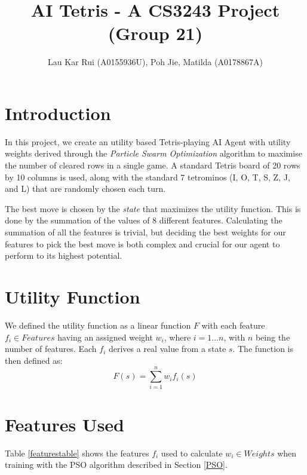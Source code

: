 \documentclass[12pt]{article}
\title{\vspace{-4.5cm}AI Tetris - A CS3243 Project (Group 21)}
\author{Lau Kar Rui (A0155936U), Poh Jie, Matilda (A0178867A)}
\numberwithin{table}{section}
\begin{document}
 
\baselineskip17.5pt
\maketitle 

\section{Introduction}
In this project, we create an utility based Tetris-playing AI Agent with utility weights derived through the \emph{Particle Swarm Optimization} algorithm to maximise the number of cleared rows in a single game. A standard Tetris board of 20 rows by 10 columns is used, along with the standard 7 tetrominos (I, O, T, S, Z, J, and L) that are randomly chosen each turn.

The best move is chosen by the \emph{state} that maximizes the utility function. This is done by the summation of the values of 8 different features. Calculating the summation of all the features is trivial, but deciding the best weights for our features to pick the best move is both complex and crucial for our agent to perform to its highest potential. 
	
\section{Utility Function}\label{util-function}
We defined the utility function as a linear function $F$ with each feature $f_i \in Features$ having an assigned weight $w_i$, where $i = 1...n$, with $n$ being the number of features. Each $f_i$ derives a real value from a state $s$. The function is then defined as:
	$$F(s) = \sum_{i = 1}^{n} w_if_i(s)$$
\section{Features Used} \label{features}
Table \ref{featurestable} shows the features $f_i$ used to calculate $w_i \in Weights$ when training with the PSO algorithm described in Section \ref{PSO}. 
\end{document}
